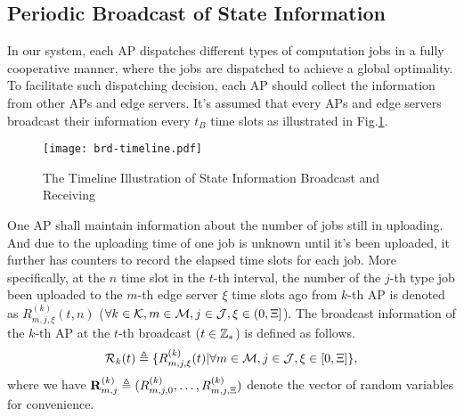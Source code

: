 
\subsection{Periodic Broadcast of State Information}
In our system, each AP dispatches different types of computation jobs in a fully cooperative manner, where the jobs are dispatched to achieve a global optimality.
To facilitate such dispatching decision, each AP should collect the information from other APs and edge servers.
It's assumed that every APs and edge servers broadcast their information every $t_B$ time slots as illustrated in Fig.\ref{fig:brd-timeline}.
\begin{figure}[ht]
    \centering
    \texttt{[image: brd-timeline.pdf]}
    \caption{The Timeline Illustration of State Information Broadcast and Receiving}
    \label{fig:brd-timeline}
\end{figure}

One AP shall maintain information about the number of jobs still in uploading. 
And due to the uploading time of one job is unknown until it's been uploaded, it further has counters to record the elapsed time slots for each job.
More specifically, at the $n$ time slot in the $t$-th interval, the number of the $j$-th type job been uploaded to the $m$-th edge server $\xi$ time slots ago from $k$-th AP is denoted as $R^{(k)}_{m,j,\xi}({t,n})$ ($\forall k\in\mathcal{K}, m\in\mathcal{M}, j\in\mathcal{J}, \xi\in(0,\Xi]$).
The broadcast information of the $k$-th AP at the $t$-th broadcast ($t\in\mathbb{Z}_{*}$) is defined as follows.
\begin{align}
    \mathcal{R}_{k}({t}) \triangleq \{R^{(k)}_{m,j,\xi}({t}) | \forall m\in\mathcal{M}, j\in\mathcal{J}, \xi \in [0,\Xi]\},
\end{align}
where we have $\mathbf{R}^{(k)}_{m,j} \triangleq ( R^{(k)}_{m,j,0},\dots,R^{(k)}_{m,j,\Xi} )$ denote the vector of random variables for convenience.

